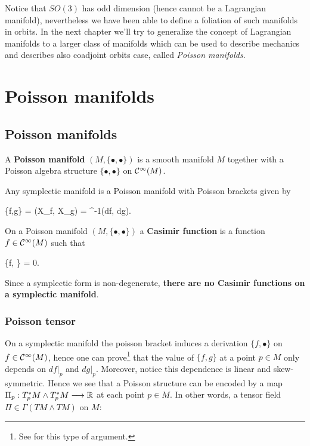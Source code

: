 \documentclass[main.tex]{subfiles}
\begin{document}
\begin{remark}
	Notice that $SO(3)$ has odd dimension (hence cannot be a Lagrangian manifold), nevertheless we have been able to define a foliation of such manifolds in orbits. In the next chapter we'll try to generalize the concept of Lagrangian manifolds to a larger class of manifolds which can be used to describe mechanics and describes also coadjoint orbits case, called \emph{Poisson manifolds}.
\end{remark}

\chapter{Poisson manifolds}
\section{Poisson manifolds}
\begin{definition}
	A \textbf{Poisson manifold} $(M, \{\bullet,\bullet\})$ is a smooth manifold $M$ together with a Poisson algebra structure $\{\bullet,\bullet\}$ on $\mathcal{C}^\infty(M)$.
\end{definition}

\begin{example}
	Any symplectic manifold is a Poisson manifold with Poisson brackets given by
	\begin{eqalign}
		\{f,g\} = \omega(X_f, X_g) = \omega^{-1}(df, dg).
	\end{eqalign}
\end{example}

\begin{definition}
	On a Poisson manifold $(M, \{\bullet,\bullet\})$ a \textbf{Casimir function} is a function $f \in \mathcal{C}^\infty(M)$ such that
	\begin{eqalign}
		\{f, \bullet\} = 0.
	\end{eqalign}
\end{definition}

\begin{remark}
	Since a symplectic form is non-degenerate, \textbf{there are no Casimir functions on a symplectic manifold}.
\end{remark}

\subsection{Poisson tensor}
On a symplectic manifold the poisson bracket induces a derivation $\{f, \bullet\}$ on $f \in \mathcal{C}^\infty(M)$, hence one can prove\footnote{See \cite[Section 33.1]{michor2008} for this type of argument.} that the value of $\{f,g\}$ at a point $p \in M$ only depends on $df\vert_p$ and $dg\vert_p$. Moreover, notice this dependence is linear and skew-symmetric. Hence we see that a Poisson structure can be encoded by a map $\Pi_p : T^*_pM \wedge T^*_pM \longrightarrow \mathbb{R}$ at each point $p \in M$. In other words, a tensor field $\Pi \in \Gamma(TM \wedge TM)$ on $M$:
\end{document}
